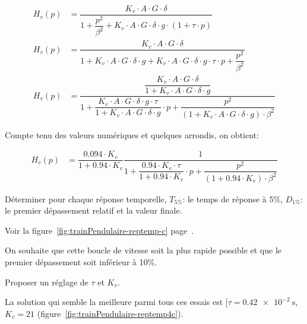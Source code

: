 \begin{Exo}[name={Devoir},title={Système de pendulation},origin={Adapté de Centrale MP 2000},label={exo:CentralePendulation}]
\begin{Cor}
\begin{multicols}{2}
\begin{align*}
H_v(p)&=\dfrac{K_v\cdot A\cdot G\cdot \delta}{{1+\dfrac{p^2}{\beta^2}}+K_v\cdot A\cdot G\cdot \delta\cdot g\cdot(1+\tau\cdot p)}\\
H_v(p)&=\dfrac{K_v\cdot A\cdot G\cdot \delta}{{1+K_v\cdot A\cdot G\cdot \delta\cdot g+K_v\cdot A\cdot G\cdot \delta\cdot g\cdot\tau\cdot p+\dfrac{p^2}{\beta^2}}}\\
H_v(p)&=\dfrac{\dfrac{K_v\cdot A\cdot G\cdot \delta}{1+K_v\cdot A\cdot G\cdot \delta\cdot g}}{1+\dfrac{K_v\cdot A\cdot G\cdot \delta\cdot g\cdot\tau}{1+K_v\cdot A\cdot G\cdot \delta\cdot g}\cdot p+\dfrac{p^2}{(1+K_v\cdot A\cdot G\cdot \delta\cdot g)\cdot\beta^2}}
\end{align*}




Compte tenu des valeurs numériques et quelques arrondis, on obtient:

\begin{align*}
H_v(p)&=\dfrac{\num{0.094}\cdot K_v}{1+\num{0.94}\cdot K_v}\dfrac{1}{1+\dfrac{\num{0.94}\cdot K_v\cdot\tau}{1+\num{0.94}\cdot K_v}\cdot p+\dfrac{p^2}{(1+\num{0.94}\cdot K_v)\cdot\beta^2}}
\end{align*}



\qst Déterminer pour chaque réponse temporelle, $T_{5\%}$: le temps de réponse à 5\%, $D_{1\%}$: le premier dépassement relatif  et la valeur finale.


Voir la figure~\ref{fig:trainPendulaire-reptemp-c}  page~\pageref{fig:trainPendulaire-reptemp-c}.




On souhaite que cette boucle de vitesse soit la plus rapide possible et que le premier dépassement soit inférieur à 10\%.

\qst Proposer un réglage de $\tau$   et $K_v$.

La solution qui semble la meilleure parmi tous ces essais est [$\tau =\SI{0.42e-2}{\second}$, $K_v = 21$ (figure~\ref{fig:trainPendulaire-reptemp4c}).



\begin{figure}[!htb]
\centering

\end{figure}
\end{multicols}
\end{Cor}
\end{Exo}

